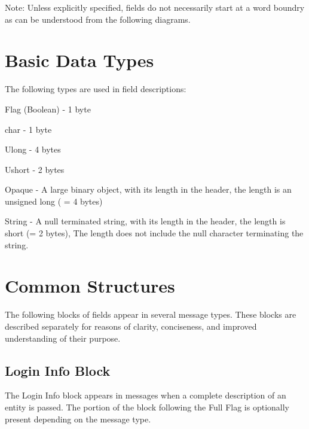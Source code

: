 \documentclass[titlepage,oneside]{book}
\begin{document}
\par{} Note: Unless explicitly specified, fields do not necessarily
start at a word boundry as can be understood from the following
diagrams.

\section{Basic Data Types}

\par{} The following types are used in field descriptions:

\par{} Flag (Boolean) - 1 byte

\par{} char           - 1 byte

\par{} Ulong          - 4 bytes

\par{} Ushort         - 2 bytes

\par{} Opaque         - A large binary object, with its length in the header,
                 the length is an unsigned long ( = 4 bytes)

\par{} String         - A null terminated string, with its length in the
                 header, the length is short (= 2 bytes), The length
                 does not include the null character terminating the
                 string.

\section{Common Structures}

\par{} The following blocks of fields appear in several message
types. These blocks are described separately for reasons of clarity,
conciseness, and improved understanding of their purpose.

\subsection{Login Info Block}

\par{} The Login Info block appears in messages when a complete
description of an entity is passed. The portion of the block following
the Full Flag is optionally present depending on the message type.
\end{document}
